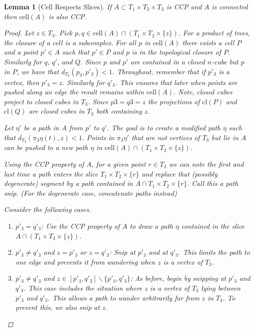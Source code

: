 \documentclass[12pt,parskip=full]{report}
\theoremstyle{plain}
\newtheorem{lem}[thm]{Lemma}
\theoremstyle{definition}
\begin{document}
\begin{lem}
    [Cell Respects Slices]
    \label{lem:cellrespecslice} 
    If $A\subset T_1\times T_2\times T_3$ is CCP and \(A\) is connected then $\text{cell}(A)$ is also CCP.

    \begin{proof}
        Let \(z\in T_3\). Pick \(p,q\in \text{cell}(A)\cap (T_1\times T_2\times \{z\})\). For a product of trees, the closure of a cell is a subcomplex. For all \(p\) in \(\text{cell}(A)\) there exists a cell \(P\) and a point \(p'\in A\) such that \(p' \in P\) and \(p\) is in the topological closure of \(P\). Similarly for \(q\), \(q'\), and \(Q\). Since \(p\) and \(p'\) are contained in a closed \(n\)-cube but \(p\) in \(P\), we have that \(d_{T_3}(p_3,p'_3)<1\). Throughout, remember that if \(p'_3\) is a vertex, then \(p'_3 = z\). Similarly for \(q'_3\). This ensures that later when points are pushed along an edge the result remains within \(\text{cell}(A)\).  Note, closed cubes project to closed cubes in \(T_3\). Since \(p3=q3=z\) the projections of \(\text{cl}(P)\) and \(\text{cl}(Q)\) are closed cubes in \(T_3\) both containing \(z\).
        
        Let $\eta'$ be a path in \(A\) from \(p'\) to \(q'\). The goal is to create a modified path \(\eta\) such that \(d_{T_3}(\pi_3\eta(t), z) <1\). Points in \(\pi_3\eta'\) that are not vertices of \(T_3\) but lie in \(A\) can be pushed to a new path \(\eta\) in \(\text{cell}(A)\cap(T_1\times T_2\times \{z\})\). 
        
        Using the CCP property of \(A\), for a given point \(r\in T_3\) we can note the first and last time a path enters the slice \(T_1\times T_2\times \{r\}\) and replace that (possibly degenerate) segment by a path contained in \(A\cap T_1\times T_2\times \{r\}\). Call this a path snip. (For the degenerate case, concatenate paths instead)
        
        Consider the following cases.
        \begin{enumerate}
            \item \(p'_3=q'_3\): Use the CCP property of \(A\) to draw a path \(\eta\) contained in the slice \(A\cap (T_1\times T_2\times \{z\})\).
            \item \(p'_3\neq q'_3\) and \(z=p'_3\) or \(z=q'_3\): Snip at \(p'_3\) and at \(q'_3\). This limits the path to one edge and prevents it from wandering when \(z\) is a vertex of \(T_3\).
            \item \(p'_3\neq q'_3\) and \(z\in [p'_3,q'_3]\smallsetminus\{p'_3,q'_3\}\): As before, begin by snipping at \(p'_3\) and \(q'_3\). This case includes the situation where \(z\) is a vertex of \(T_3\) lying between \(p'_3\) and \(q'_3\). This allows a path to wander arbitrarily far from \(z\) in \(T_3\). To prevent this, we also snip at \(z\).
        \end{enumerate}


\end{proof}
\end{lem}
\end{document}

